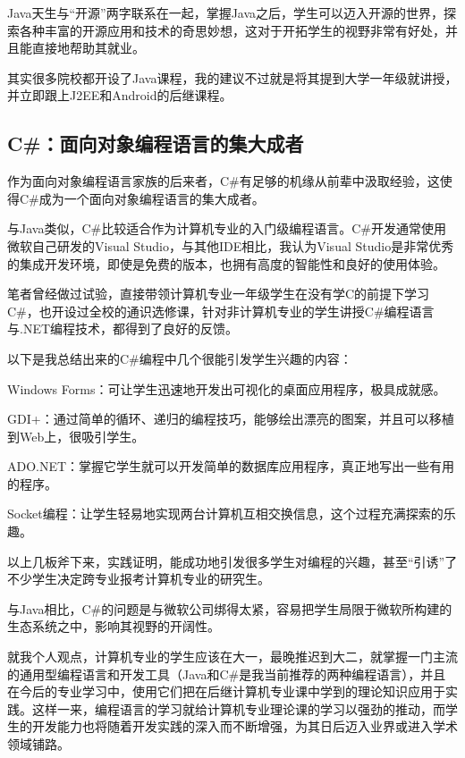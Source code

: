 Java天生与“开源”两字联系在一起，掌握Java之后，学生可以迈入开源的世界，探索各种丰富的开源应用和技术的奇思妙想，这对于开拓学生的视野非常有好处，并且能直接地帮助其就业。

其实很多院校都开设了Java课程，我的建议不过就是将其提到大学一年级就讲授，并立即跟上J2EE和Android的后继课程。

\subsection{C\#：面向对象编程语言的集大成者}

作为面向对象编程语言家族的后来者，C\#有足够的机缘从前辈中汲取经验，这使得C\#成为一个面向对象编程语言的集大成者。

与Java类似，C\#比较适合作为计算机专业的入门级编程语言。C\#开发通常使用微软自己研发的Visual Studio，与其他IDE相比，我认为Visual Studio是非常优秀的集成开发环境，即使是免费的版本，也拥有高度的智能性和良好的使用体验。

笔者曾经做过试验，直接带领计算机专业一年级学生在没有学C的前提下学习C\#，也开设过全校的通识选修课，针对非计算机专业的学生讲授C\#编程语言与.NET编程技术，都得到了良好的反馈。

以下是我总结出来的C\#编程中几个很能引发学生兴趣的内容：

\begin{compactenum}
\item Windows Forms：可让学生迅速地开发出可视化的桌面应用程序，极具成就感。
\item GDI+：通过简单的循环、递归的编程技巧，能够绘出漂亮的图案，并且可以移植到Web上，很吸引学生。
\item ADO.NET：掌握它学生就可以开发简单的数据库应用程序，真正地写出一些有用的程序。
\item Socket编程：让学生轻易地实现两台计算机互相交换信息，这个过程充满探索的乐趣。
\end{compactenum}

以上几板斧下来，实践证明，能成功地引发很多学生对编程的兴趣，甚至“引诱”了不少学生决定跨专业报考计算机专业的研究生。

与Java相比，C\#的问题是与微软公司绑得太紧，容易把学生局限于微软所构建的生态系统之中，影响其视野的开阔性。

就我个人观点，计算机专业的学生应该在大一，最晚推迟到大二，就掌握一门主流的通用型编程语言和开发工具（Java和C\#是我当前推荐的两种编程语言），并且在今后的专业学习中，使用它们把在后继计算机专业课中学到的理论知识应用于实践。这样一来，编程语言的学习就给计算机专业理论课的学习以强劲的推动，而学生的开发能力也将随着开发实践的深入而不断增强，为其日后迈入业界或进入学术领域铺路。

